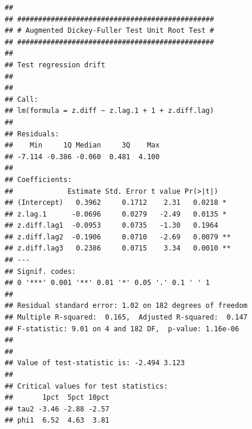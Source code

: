 \documentclass[]{book}
\newenvironment{Shaded}{\begin{snugshade}}{\end{snugshade}}
\newcommand{\CommentTok}[1]{\textcolor[rgb]{0.56,0.35,0.01}{\textit{#1}}}
\newcommand{\DataTypeTok}[1]{\textcolor[rgb]{0.13,0.29,0.53}{#1}}
\newcommand{\DecValTok}[1]{\textcolor[rgb]{0.00,0.00,0.81}{#1}}
\newcommand{\KeywordTok}[1]{\textcolor[rgb]{0.13,0.29,0.53}{\textbf{#1}}}
\newcommand{\NormalTok}[1]{#1}
\newcommand{\OperatorTok}[1]{\textcolor[rgb]{0.81,0.36,0.00}{\textbf{#1}}}
\newcommand{\StringTok}[1]{\textcolor[rgb]{0.31,0.60,0.02}{#1}}
\begin{document}
\begin{verbatim}
## 
## ############################################### 
## # Augmented Dickey-Fuller Test Unit Root Test # 
## ############################################### 
## 
## Test regression drift 
## 
## 
## Call:
## lm(formula = z.diff ~ z.lag.1 + 1 + z.diff.lag)
## 
## Residuals:
##    Min     1Q Median     3Q    Max 
## -7.114 -0.386 -0.060  0.481  4.100 
## 
## Coefficients:
##             Estimate Std. Error t value Pr(>|t|)   
## (Intercept)   0.3962     0.1712    2.31   0.0218 * 
## z.lag.1      -0.0696     0.0279   -2.49   0.0135 * 
## z.diff.lag1  -0.0953     0.0735   -1.30   0.1964   
## z.diff.lag2  -0.1906     0.0710   -2.69   0.0079 **
## z.diff.lag3   0.2386     0.0715    3.34   0.0010 **
## ---
## Signif. codes:  
## 0 '***' 0.001 '**' 0.01 '*' 0.05 '.' 0.1 ' ' 1
## 
## Residual standard error: 1.02 on 182 degrees of freedom
## Multiple R-squared:  0.165,  Adjusted R-squared:  0.147 
## F-statistic: 9.01 on 4 and 182 DF,  p-value: 1.16e-06
## 
## 
## Value of test-statistic is: -2.494 3.123 
## 
## Critical values for test statistics: 
##       1pct  5pct 10pct
## tau2 -3.46 -2.88 -2.57
## phi1  6.52  4.63  3.81
\end{verbatim}

\begin{Shaded}
\end{Shaded}
\end{document}
